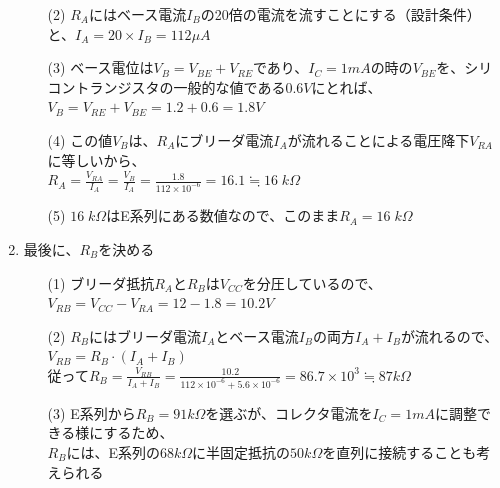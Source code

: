 \documentclass[uplatex,a4paper,11pt,oneside,openany]{jsbook}
\begin{document}
\begin{enumerate}
\begin{enumerate}
\item[(2)] $R_A$にはベース電流$I_B$の20倍の電流を流すことにする（設計条件）と、$I_A=20\times I_B=112\mu A$
\item[(3)] ベース電位は$V_B=V_{BE}+V_{RE}$であり、$I_C=1mA$の時の$V_{BE}$を、シリコントランジスタの一般的な値である$0.6V$にとれば、
$V_B=V_{RE}+V_{BE}=1.2+0.6=1.8V$
\item[(4)] この値$V_B$は、$R_A$にブリーダ電流$I_A$が流れることによる電圧降下$V_{RA}$に等しいから、\\
$R_A=\displaystyle\frac{V_{RA}}{I_A}=\frac{V_B}{I_A}=\frac{1.8}{112\times 10^{-6}}=16.1\fallingdotseq 16\;k\Omega$
\item[(5)] $16\;k\Omega$はE系列にある数値なので、このまま$R_A=16\;k\Omega$
\end{enumerate}
\vfill
\item 最後に、$R_B$を決める
\begin{enumerate}
\item[(1)] ブリーダ抵抗$R_A$と$R_B$は$V_{CC}$を分圧しているので、
$V_{RB}=V_{CC}-V_{RA}=12-1.8=10.2V$
\item[(2)] $R_B$にはブリーダ電流$I_A$とベース電流$I_B$の両方$I_A+I_B$が流れるので、
$V_{RB}=R_B\cdot(I_A+I_B)$\\
従って$R_B=\displaystyle\frac{V_{RB}}{I_A+I_B}=\frac{10.2}{112\times 10^{-6}+5.6\times 10^{-6}}=86.7\times 10^3\fallingdotseq 87k\Omega$
\item[(3)] E系列から$R_B=91k\Omega$を選ぶが、コレクタ電流を$I_C=1mA$に調整できる様にするため、\\
$R_B$には、E系列の$68k\Omega$に半固定抵抗の$50k\Omega$を直列に接続することも考えられる
\end{enumerate}
\end{enumerate}

\vfill
\end{document}
